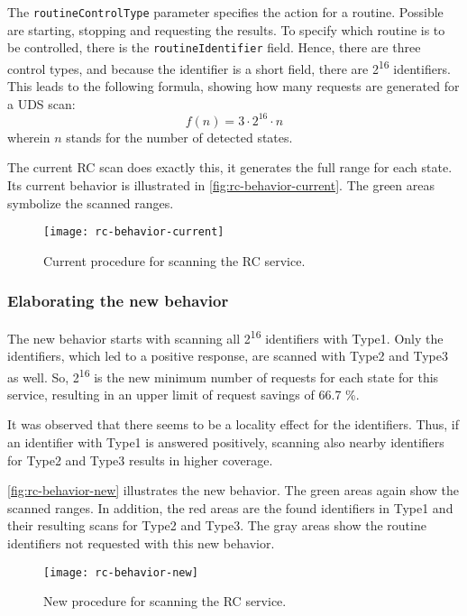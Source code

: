 The \texttt{routineControlType} parameter specifies the action for a routine. Possible are starting, stopping and requesting the results. To specify which routine is to be controlled, there is the \texttt{routineIdentifier} field. Hence, there are three control types, and because the identifier is a short field, there are 2\textsuperscript{16} identifiers. This leads to the following formula, showing how many requests are generated for a UDS scan:
\[f(n)=3 \cdot 2^{16} \cdot n\]
wherein $n$ stands for the number of detected states.

The current RC scan does exactly this, it generates the full range for each state. Its current behavior is illustrated in \autoref{fig:rc-behavior-current}. The green areas symbolize the scanned ranges.

\begin{figure}[h]
    \centering
    \texttt{[image: rc-behavior-current]}
    \caption{Current procedure for scanning the RC service.}
    \label{fig:rc-behavior-current}
\end{figure}

\subsubsection{Elaborating the new behavior}
\label{subsubsec:rc-elaborating}

The new behavior starts with scanning all 2\textsuperscript{16} identifiers with Type1. Only the identifiers, which led to a positive response, are scanned with Type2 and Type3 as well. So, 2\textsuperscript{16} is the new minimum number of requests for each state for this service, resulting in an upper limit of request savings of 66.7 \%.

It was observed that there seems to be a locality effect for the identifiers. Thus, if an identifier with Type1 is answered positively, scanning also nearby identifiers for Type2 and Type3 results in higher coverage.

\autoref{fig:rc-behavior-new} illustrates the new behavior. The green areas again show the scanned ranges. In addition, the red areas are the found identifiers in Type1 and their resulting scans for Type2 and Type3. The gray areas show the routine identifiers not requested with this new behavior.

\begin{figure}[h]
    \centering
    \texttt{[image: rc-behavior-new]}
    \caption{New procedure for scanning the RC service.}
    \label{fig:rc-behavior-new}
\end{figure}

